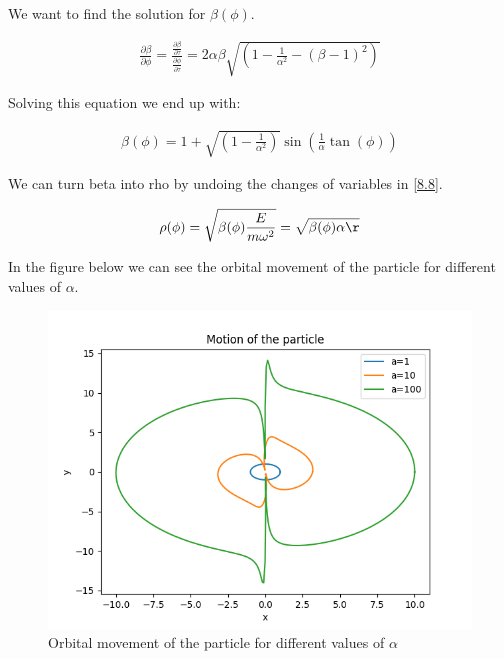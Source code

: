 We want to find the solution for $\beta (\phi)$.

\begin{equation}
  \begin{array}{c}
    \frac{\partial\beta}{\partial\phi} = \frac{\frac{\partial\beta}{\partial\tau}}{\frac{\partial\phi}{\partial\tau}} = 2\alpha\beta\sqrt{\left(1-\frac{1}{\alpha^2}-(\beta-1)^2\right)}
  \end{array}
\end{equation}

Solving this equation we end up with:

\begin{equation}
  \begin{array}{c}
    \beta(\phi) = 1+\sqrt{\left(1-\frac{1}{\alpha^2}\right)} \sin\left(\frac{1}{\alpha}\tan(\phi)\right)
  \end{array}
\end{equation}

We can turn beta into rho by undoing the changes of variables in \ref{8.8}.

\begin{equation}
    \rho(\phi) = \sqrt{\beta(\phi)\frac{E}{m\omega^2}} = \sqrt{\beta(\phi)\alpha \r}
\end{equation}

In the figure below we can see the orbital movement of the particle for different values of $\alpha$.

\begin{figure}
  \centering
  \includegraphics{images8/beta_theta.png}
  \caption{Orbital movement of the particle for different values of $\alpha$}
\end{figure}

